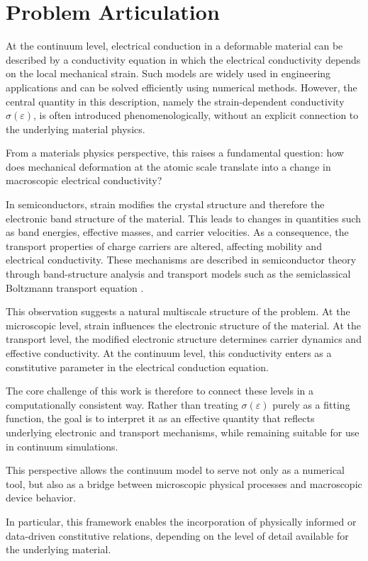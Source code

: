 \section{Problem Articulation}

At the continuum level, electrical conduction in a deformable material can be described 
by a conductivity equation in which the electrical conductivity depends on the local mechanical strain. 
Such models are widely used in engineering applications and can be solved efficiently using numerical methods. 
However, the central quantity in this description, namely the strain-dependent conductivity $\sigma(\varepsilon)$, 
is often introduced phenomenologically, without an explicit connection to the underlying material physics.

From a materials physics perspective, this raises a fundamental question: 
how does mechanical deformation at the atomic scale translate into a change in macroscopic electrical conductivity?

In semiconductors, strain modifies the crystal structure and therefore the electronic band structure of the material. 
This leads to changes in quantities such as band energies, effective masses, and carrier velocities. 
As a consequence, the transport properties of charge carriers are altered, affecting mobility and electrical conductivity. 
These mechanisms are described in semiconductor theory through band-structure analysis and transport models 
such as the semiclassical Boltzmann transport equation \cite{hamaguchi}.

This observation suggests a natural multiscale structure of the problem. 
At the microscopic level, strain influences the electronic structure of the material. 
At the transport level, the modified electronic structure determines carrier dynamics and effective conductivity. 
At the continuum level, this conductivity enters as a constitutive parameter in the electrical conduction equation.

The core challenge of this work is therefore to connect these levels in a computationally consistent way. 
Rather than treating $\sigma(\varepsilon)$ purely as a fitting function, the goal is to interpret it as an effective quantity 
that reflects underlying electronic and transport mechanisms, while remaining suitable for use in continuum simulations.

This perspective allows the continuum model to serve not only as a numerical tool, but also as a bridge between 
microscopic physical processes and macroscopic device behavior.

In particular, this framework enables the incorporation of physically informed or data-driven constitutive relations, depending on the level of detail available for the underlying material.